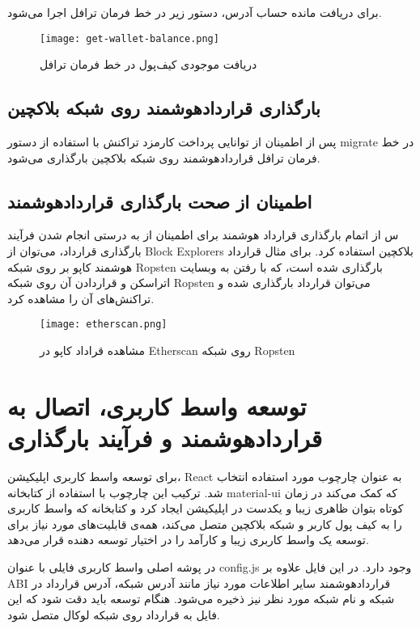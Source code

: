 برای دریافت مانده حساب آدرس، دستور زیر در خط فرمان ترافل اجرا می‌شود.

\begin{figure}[ht]
\centerline{\texttt{[image: get-wallet-balance.png]}}
\caption{دریافت موجودی کیف‌پول در خط فرمان ترافل}
\label{fig:get-wallet-balance}
\end{figure}


\subsection{بارگذاری قراردادهوشمند روی شبکه بلاکچین}
پس از اطمینان از توانایی پرداخت کارمزد تراکنش با استفاده از دستور migrate در خط فرمان ترافل قراردادهوشمند روی شبکه بلاکچین بارگذاری می‌شود.


\subsection{اطمینان از صحت بارگذاری قراردادهوشمند}
س از اتمام بارگذاری قرارداد هوشمند برای اطمینان از به درستی انجام شدن فرآیند بارگذاری قرارداد، می‌توان از
\glspl{Block Explorer}
بلاکچین استفاده کرد. برای مثال قرارداد هوشمند کاپو بر روی شبکه Ropsten بارگذاری شده است، که با رفتن به وبسایت اتراسکن
و قراردادن آن روی شبکه Ropsten می‌توان قرارداد بارگذاری شده و تراکنش‌های آن را مشاهده کرد.


\begin{figure}[ht]
\centerline{\texttt{[image: etherscan.png]}}
\caption{مشاهده قراداد کاپو در Etherscan روی شبکه Ropsten}
\label{fig:etherscan}
\end{figure}


\section{توسعه واسط کاربری، اتصال به قراردادهوشمند و فرآیند بارگذاری}
برای توسعه واسط کاربری اپلیکیشن، React به عنوان چارچوب مورد استفاده انتخاب شد. ترکیب این چارچوب با استفاده از کتابخانه material-ui که کمک می‌کند در زمان کوتاه بتوان ظاهری زیبا و یکدست در اپلیکیشن ایجاد کرد و کتابخانه
که واسط کاربری را به کیف پول کاربر و شبکه بلاکچین متصل می‌کند، همه‌ی قابلیت‌های مورد نیاز برای توسعه یک واسط کاربری زیبا و کارآمد را در اختیار توسعه دهنده قرار می‌دهد.

در پوشه اصلی واسط کاربری فایلی با عنوان config.js وجود دارد. در این فایل علاوه بر ABI قراردادهوشمند سایر اطلاعات مورد نیاز مانند آدرس شبکه، آدرس قرارداد در شبکه و نام شبکه مورد نظر نیز ذخیره می‌شود. هنگام توسعه باید دقت شود که این فایل به قرارداد روی شبکه لوکال متصل شود.

